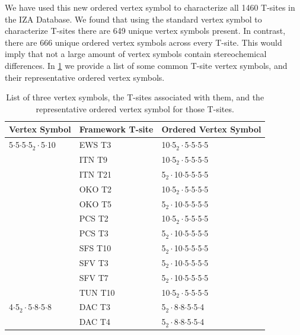 \documentclass[11pt]{article}
\begin{document}
We have used this new ordered vertex symbol to characterize all 1460 T-sites in the IZA Database. We found that using the standard vertex symbol to characterize T-sites there are 649 unique vertex symbols present. In contrast, there are 666 unique ordered vertex symbols across every T-site. This would imply that not a large amount of vertex symbols contain stereochemical differences. In \cref{tab:ov} we provide a list of some common T-site vertex symbols, and their representative ordered vertex symbols. 

\begin{table}
\centering
\begin{threeparttable}
\caption{List of three vertex symbols, the T-sites associated with them, and the representative ordered vertex symbol for those T-sites. \label{tab:ov}}
{\scriptsize
\begin{tabular}{lll}
\hline
Vertex Symbol & Framework T-site & Ordered Vertex Symbol\\
\hline
5\(\cdot\)5\(\cdot\)5\(\cdot\)5\(_{\text{2}} \cdot\)5\(\cdot\)10 & EWS T3 & 10\(\cdot\)5\(_{\text{2}} \cdot\)5\(\cdot\)5\(\cdot\)5\(\cdot\)5\\
 & ITN T9 & 10\(\cdot\)5\(_{\text{2}} \cdot\)5\(\cdot\)5\(\cdot\)5\(\cdot\)5\\
 & ITN T21 & 5\(_{\text{2}} \cdot\)10\(\cdot\)5\(\cdot\)5\(\cdot\)5\(\cdot\)5\\
 & OKO T2 & 10\(\cdot\)5\(_{\text{2}} \cdot\)5\(\cdot\)5\(\cdot\)5\(\cdot\)5\\
 & OKO T5 & 5\(_{\text{2}} \cdot\)10\(\cdot\)5\(\cdot\)5\(\cdot\)5\(\cdot\)5\\
 & PCS T2 & 10\(\cdot\)5\(_{\text{2}} \cdot\)5\(\cdot\)5\(\cdot\)5\(\cdot\)5\\
 & PCS T3 & 5\(_{\text{2}} \cdot\)10\(\cdot\)5\(\cdot\)5\(\cdot\)5\(\cdot\)5\\
 & SFS T10 & 5\(_{\text{2}} \cdot\)10\(\cdot\)5\(\cdot\)5\(\cdot\)5\(\cdot\)5\\
 & SFV T3 & 5\(_{\text{2}} \cdot\)10\(\cdot\)5\(\cdot\)5\(\cdot\)5\(\cdot\)5\\
 & SFV T7 & 5\(_{\text{2}} \cdot\)10\(\cdot\)5\(\cdot\)5\(\cdot\)5\(\cdot\)5\\
 & TUN T10 & 10\(\cdot\)5\(_{\text{2}} \cdot\)5\(\cdot\)5\(\cdot\)5\(\cdot\)5\\
\hline
4\(\cdot\)5\(_{\text{2}} \cdot\)5\(\cdot\)8\(\cdot\)5\(\cdot\)8 & DAC T3 & 5\(_{\text{2}} \cdot\)8\(\cdot\)8\(\cdot\)5\(\cdot\)5\(\cdot\)4\\
 & DAC T4 & 5\(_{\text{2}} \cdot\)8\(\cdot\)8\(\cdot\)5\(\cdot\)5\(\cdot\)4\\

\end{tabular}}
\end{threeparttable}
\end{table}
\end{document}
